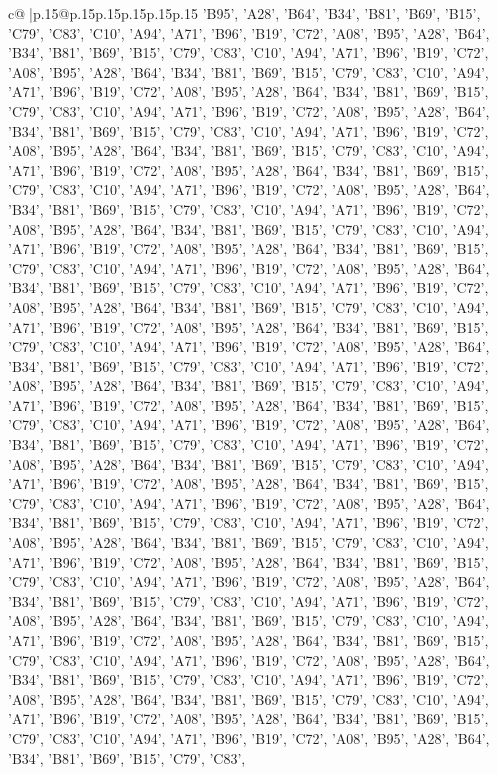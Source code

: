 \documentclass{article}
\begin{document}
{\begin{supertabular}{c@{$\;$}|p{.15\linewidth}@{}p{.15\linewidth}p{.15\linewidth}p{.15\linewidth}p{.15\linewidth}p{.15\linewidth}}
{{{{'B95', 'A28', 'B64', 'B34', 'B81', 'B69', 'B15', 'C79', 'C83', 'C10', 'A94', 'A71', 'B96', 'B19', 'C72', 'A08', 'B95', 'A28', 'B64', 'B34', 'B81', 'B69', 'B15', 'C79', 'C83', 'C10', 'A94', 'A71', 'B96', 'B19', 'C72', 'A08', 'B95', 'A28', 'B64', 'B34', 'B81', 'B69', 'B15', 'C79', 'C83', 'C10', 'A94', 'A71', 'B96', 'B19', 'C72', 'A08', 'B95', 'A28', 'B64', 'B34', 'B81', 'B69', 'B15', 'C79', 'C83', 'C10', 'A94', 'A71', 'B96', 'B19', 'C72', 'A08', 'B95', 'A28', 'B64', 'B34', 'B81', 'B69', 'B15', 'C79', 'C83', 'C10', 'A94', 'A71', 'B96', 'B19', 'C72', 'A08', 'B95', 'A28', 'B64', 'B34', 'B81', 'B69', 'B15', 'C79', 'C83', 'C10', 'A94', 'A71', 'B96', 'B19', 'C72', 'A08', 'B95', 'A28', 'B64', 'B34', 'B81', 'B69', 'B15', 'C79', 'C83', 'C10', 'A94', 'A71', 'B96', 'B19', 'C72', 'A08', 'B95', 'A28', 'B64', 'B34', 'B81', 'B69', 'B15', 'C79', 'C83', 'C10', 'A94', 'A71', 'B96', 'B19', 'C72', 'A08', 'B95', 'A28', 'B64', 'B34', 'B81', 'B69', 'B15', 'C79', 'C83', 'C10', 'A94', 'A71', 'B96', 'B19', 'C72', 'A08', 'B95', 'A28', 'B64', 'B34', 'B81', 'B69', 'B15', 'C79', 'C83', 'C10', 'A94', 'A71', 'B96', 'B19', 'C72', 'A08', 'B95', 'A28', 'B64', 'B34', 'B81', 'B69', 'B15', 'C79', 'C83', 'C10', 'A94', 'A71', 'B96', 'B19', 'C72', 'A08', 'B95', 'A28', 'B64', 'B34', 'B81', 'B69', 'B15', 'C79', 'C83', 'C10', 'A94', 'A71', 'B96', 'B19', 'C72', 'A08', 'B95', 'A28', 'B64', 'B34', 'B81', 'B69', 'B15', 'C79', 'C83', 'C10', 'A94', 'A71', 'B96', 'B19', 'C72', 'A08', 'B95', 'A28', 'B64', 'B34', 'B81', 'B69', 'B15', 'C79', 'C83', 'C10', 'A94', 'A71', 'B96', 'B19', 'C72', 'A08', 'B95', 'A28', 'B64', 'B34', 'B81', 'B69', 'B15', 'C79', 'C83', 'C10', 'A94', 'A71', 'B96', 'B19', 'C72', 'A08', 'B95', 'A28', 'B64', 'B34', 'B81', 'B69', 'B15', 'C79', 'C83', 'C10', 'A94', 'A71', 'B96', 'B19', 'C72', 'A08', 'B95', 'A28', 'B64', 'B34', 'B81', 'B69', 'B15', 'C79', 'C83', 'C10', 'A94', 'A71', 'B96', 'B19', 'C72', 'A08', 'B95', 'A28', 'B64', 'B34', 'B81', 'B69', 'B15', 'C79', 'C83', 'C10', 'A94', 'A71', 'B96', 'B19', 'C72', 'A08', 'B95', 'A28', 'B64', 'B34', 'B81', 'B69', 'B15', 'C79', 'C83', 'C10', 'A94', 'A71', 'B96', 'B19', 'C72', 'A08', 'B95', 'A28', 'B64', 'B34', 'B81', 'B69', 'B15', 'C79', 'C83', 'C10', 'A94', 'A71', 'B96', 'B19', 'C72', 'A08', 'B95', 'A28', 'B64', 'B34', 'B81', 'B69', 'B15', 'C79', 'C83', 'C10', 'A94', 'A71', 'B96', 'B19', 'C72', 'A08', 'B95', 'A28', 'B64', 'B34', 'B81', 'B69', 'B15', 'C79', 'C83', 'C10', 'A94', 'A71', 'B96', 'B19', 'C72', 'A08', 'B95', 'A28', 'B64', 'B34', 'B81', 'B69', 'B15', 'C79', 'C83', 'C10', 'A94', 'A71', 'B96', 'B19', 'C72', 'A08', 'B95', 'A28', 'B64', 'B34', 'B81', 'B69', 'B15', 'C79', 'C83', 'C10', 'A94', 'A71', 'B96', 'B19', 'C72', 'A08', 'B95', 'A28', 'B64', 'B34', 'B81', 'B69', 'B15', 'C79', 'C83', 'C10', 'A94', 'A71', 'B96', 'B19', 'C72', 'A08', 'B95', 'A28', 'B64', 'B34', 'B81', 'B69', 'B15', 'C79', 'C83', 'C10', 'A94', 'A71', 'B96', 'B19', 'C72', 'A08', 'B95', 'A28', 'B64', 'B34', 'B81', 'B69', 'B15', 'C79', 'C83', 'C10', 'A94', 'A71', 'B96', 'B19', 'C72', 'A08', 'B95', 'A28', 'B64', 'B34', 'B81', 'B69', 'B15', 'C79', 'C83', 'C10', 'A94', 'A71', 'B96', 'B19', 'C72', 'A08', 'B95', 'A28', 'B64', 'B34', 'B81', 'B69', 'B15', 'C79', 'C83', }}}}
\end{supertabular}}
\end{document}
